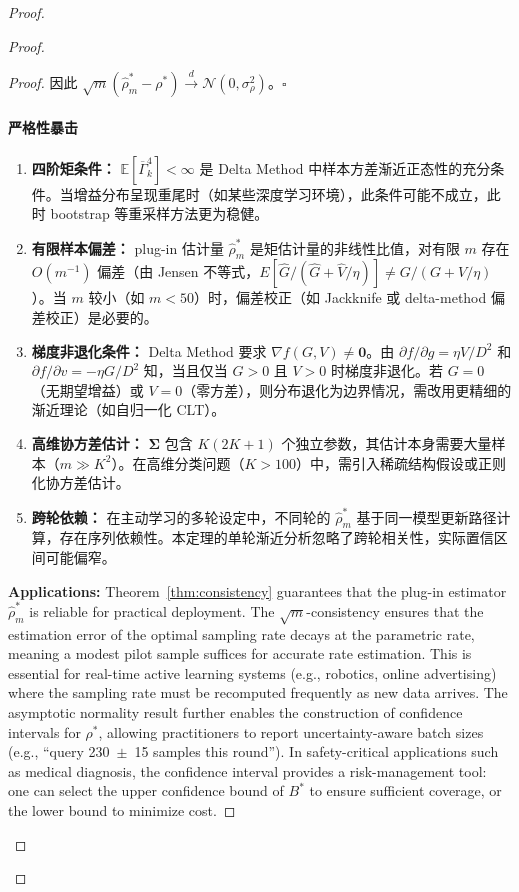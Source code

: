 \documentclass[12pt,a4paper]{article}
\newcommand{\E}{\mathbb{E}}
\newenvironment{critique}{\paragraph{严格性暴击}\quad}{\par}
\begin{document}
\begin{proof}
\begin{proof}
\begin{proof}
因此 $\sqrt{m}(\hat\rho^*_m - \rho^*) \xrightarrow{d} \mathcal{N}(0,\sigma^2_\rho)$。\hfill$\square$

\begin{critique}
\begin{enumerate}
    \item \textbf{四阶矩条件：} $\E[\overline{\Gamma}_k^4]<\infty$ 是 Delta Method 中样本方差渐近正态性的充分条件。当增益分布呈现重尾时（如某些深度学习环境），此条件可能不成立，此时 bootstrap 等重采样方法更为稳健。
    \item \textbf{有限样本偏差：} plug-in 估计量 $\hat\rho^*_m$ 是矩估计量的非线性比值，对有限 $m$ 存在 $O(m^{-1})$ 偏差（由 Jensen 不等式，$E[\hat G/(\hat G+\hat V/\eta)] \neq G/(G+V/\eta)$）。当 $m$ 较小（如 $m<50$）时，偏差校正（如 Jackknife 或 delta-method 偏差校正）是必要的。
    \item \textbf{梯度非退化条件：} Delta Method 要求 $\nabla f(G,V) \neq \bm 0$。由 $\partial f/\partial g = \eta V/D^2$ 和 $\partial f/\partial v = -\eta G/D^2$ 知，当且仅当 $G>0$ 且 $V>0$ 时梯度非退化。若 $G=0$（无期望增益）或 $V=0$（零方差），则分布退化为边界情况，需改用更精细的渐近理论（如自归一化 CLT）。
    \item \textbf{高维协方差估计：} $\bm\Sigma$ 包含 $K(2K+1)$ 个独立参数，其估计本身需要大量样本（$m\gg K^2$）。在高维分类问题（$K>100$）中，需引入稀疏结构假设或正则化协方差估计。
    \item \textbf{跨轮依赖：} 在主动学习的多轮设定中，不同轮的 $\hat\rho^*_m$ 基于同一模型更新路径计算，存在序列依赖性。本定理的单轮渐近分析忽略了跨轮相关性，实际置信区间可能偏窄。
\end{enumerate}
\end{critique}

\medskip\noindent
\textbf{Applications:}
Theorem~\ref{thm:consistency} guarantees that the plug-in estimator
$\hat{\rho}^*_m$ is reliable for practical deployment.  The
$\sqrt{m}$-consistency ensures that the estimation error of the optimal
sampling rate decays at the parametric rate, meaning a modest pilot sample
suffices for accurate rate estimation.  This is essential for real-time active
learning systems (e.g., robotics, online advertising) where the sampling rate
must be recomputed frequently as new data arrives.  The asymptotic normality
result further enables the construction of confidence intervals for $\rho^*$,
allowing practitioners to report uncertainty-aware batch sizes (e.g.,
``query 230~$\pm$~15 samples this round'').  In safety-critical applications
such as medical diagnosis, the confidence interval provides a
risk-management tool: one can select the upper confidence bound of $B^*$
to ensure sufficient coverage, or the lower bound to minimize cost.


\end{proof}
\end{proof}
\end{proof}
\end{document}
